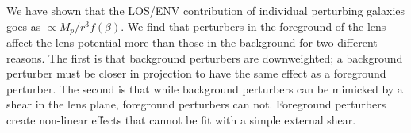 We have shown that the LOS/ENV contribution of individual perturbing galaxies goes as $\propto M_p /r^3 f(\beta)$. We find that perturbers in the foreground of the lens affect the lens potential more than those in the background for two different reasons. The first is that background perturbers are downweighted; a background perturber must be closer in projection to have the same effect as a foreground perturber. The second is that while background perturbers can be mimicked by a shear in the lens plane, foreground perturbers can not. Foreground perturbers create non-linear effects that cannot be fit with a simple external shear.